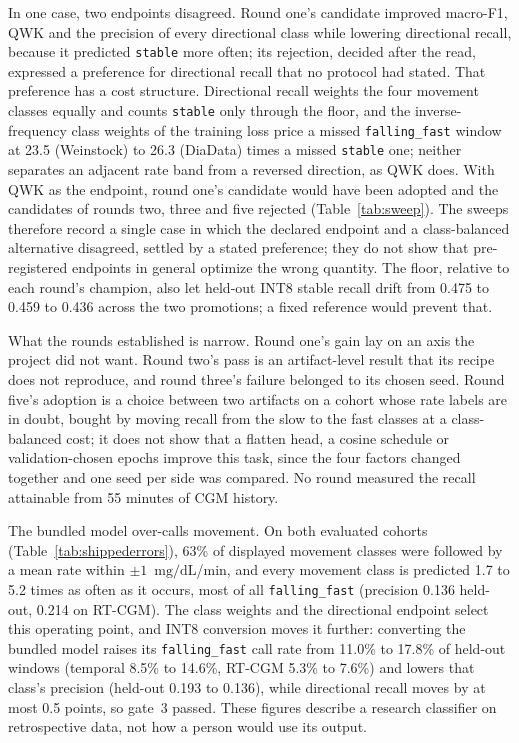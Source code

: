 \documentclass[10pt,twocolumn]{article}
\newcommand{\mgdl}{\ensuremath{\mathrm{mg/dL}}}
\begin{document}
In one case, two endpoints disagreed. Round one's candidate improved
macro-F1, QWK and the precision of every directional class while lowering
directional recall, because it predicted
\texttt{stable} more often; its rejection, decided after the read,
expressed a preference for directional recall that no protocol had
stated. That preference has a cost structure. Directional recall weights
the four movement classes equally and counts \texttt{stable} only through
the floor, and the inverse-frequency class weights of the training loss
price a missed \texttt{falling\_fast} window at 23.5 (Weinstock) to 26.3
(DiaData) times a missed \texttt{stable} one; neither separates an
adjacent rate band from a reversed direction, as QWK does. With QWK as
the endpoint, round one's candidate would have been adopted and the
candidates of rounds two, three and five rejected (Table~\ref{tab:sweep}). The sweeps therefore record a single case in
which the declared endpoint and a class-balanced alternative disagreed,
settled by a stated preference; they do not show that pre-registered
endpoints in general optimize the wrong quantity. The floor, relative to
each round's champion, also let held-out INT8 stable recall drift from
0.475 to 0.459 to 0.436 across the two promotions; a fixed reference would
prevent that.

What the rounds established is narrow. Round one's gain lay on an axis
the project did not want. Round two's pass is an artifact-level result
that its recipe does not reproduce, and round three's failure belonged to
its chosen seed. Round five's adoption is a choice between two artifacts
on a cohort whose rate labels are in doubt, bought by moving recall from
the slow to the fast classes at a class-balanced cost; it does not show
that a flatten head, a cosine schedule or validation-chosen epochs improve
this task, since the four factors changed together and one seed per side
was compared. No round measured the recall attainable from 55 minutes of
CGM history.

The bundled model over-calls movement. On both evaluated cohorts
(Table~\ref{tab:shippederrors}), 63\% of displayed movement classes were
followed by a mean rate within $\pm1$~\mgdl/min, and every movement class
is predicted 1.7 to 5.2 times as often as it occurs, most of all
\texttt{falling\_fast} (precision 0.136 held-out, 0.214 on RT-CGM). The
class weights and the directional endpoint select this operating point,
and INT8 conversion moves it further: converting the bundled model raises
its \texttt{falling\_fast} call rate from 11.0\% to 17.8\% of held-out
windows (temporal 8.5\% to 14.6\%, RT-CGM 5.3\% to 7.6\%) and lowers that
class's precision (held-out 0.193 to 0.136), while directional recall
moves by at most 0.5 points, so gate~3 passed. These figures describe a
research classifier on retrospective data, not how a person would use its
output.
\end{document}
